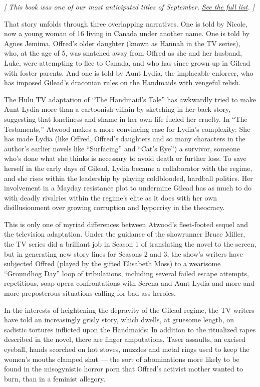 \emph{{[} This book was one of our most anticipated titles of
September.}
\href{https://www.nytimes.com/2019/08/28/books/new-september-books.html}{\emph{See
the full list}}\emph{. {]}}

That story unfolds through three overlapping narratives. One is told by
Nicole, now a young woman of 16 living in Canada under another name. One
is told by Agnes Jemima, Offred's older daughter (known as Hannah in the
TV series), who, at the age of 5, was snatched away from Offred as she
and her husband, Luke, were attempting to flee to Canada, and who has
since grown up in Gilead with foster parents. And one is told by Aunt
Lydia, the implacable enforcer, who has imposed Gilead's draconian rules
on the Handmaids with vengeful relish.

The Hulu TV adaptation of ``The Handmaid's Tale'' has awkwardly tried to
make Aunt Lydia more than a cartoonish villain by sketching in her back
story, suggesting that loneliness and shame in her own life fueled her
cruelty. In ``The Testaments,'' Atwood makes a more convincing case for
Lydia's complexity: She has made Lydia (like Offred, Offred's daughters
and so many characters in the author's earlier novels like ``Surfacing''
and ``Cat's Eye'') a survivor, someone who's done what she thinks is
necessary to avoid death or further loss. To save herself in the early
days of Gilead, Lydia became a collaborator with the regime, and she
rises within the leadership by playing coldblooded, hardball politics.
Her involvement in a Mayday resistance plot to undermine Gilead has as
much to do with deadly rivalries within the regime's elite as it does
with her own disillusionment over growing corruption and hypocrisy in
the theocracy.

This is only one of myriad differences between Atwood's fleet-footed
sequel and the television adaptation. Under the guidance of the
showrunner Bruce Miller, the TV series did a brilliant job in Season 1
of translating the novel to the screen, but in generating new story
lines for Seasons 2 and 3, the show's writers have subjected Offred
(played by the gifted Elisabeth Moss) to a wearisome ``Groundhog Day''
loop of tribulations, including several failed escape attempts,
repetitious, soap-opera confrontations with Serena and Aunt Lydia and
more and more preposterous situations calling for bad-ass heroics.

In the interests of heightening the depravity of the Gilead regime, the
TV writers have told an increasingly grisly story, which dwells, at
gruesome length, on sadistic tortures inflicted upon the Handmaids: In
addition to the ritualized rapes described in the novel, there are
finger amputations, Taser assaults, an excised eyeball, hands scorched
on hot stoves, muzzles and metal rings used to keep the women's mouths
clamped shut --- the sort of abominations more likely to be found in the
misogynistic horror porn that Offred's activist mother wanted to burn,
than in a feminist allegory.

